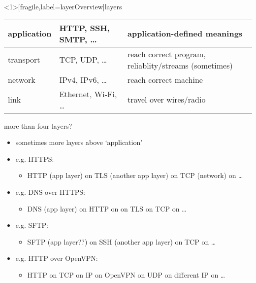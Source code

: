 \begin{frame}<1>[fragile,label=layerOverview]{layers}
\begin{tabular}{l|l|p{6cm}} \hline
application & HTTP, SSH, SMTP, \ldots & {application-defined meanings}\\ \hline
transport & TCP, UDP, \ldots & {reach correct program, reliablity/streams (sometimes)} \\
network & IPv4, IPv6, \ldots & {reach correct machine} \\
link & Ethernet, Wi-Fi, \ldots & travel over wires/radio \\
\end{tabular}
\end{frame}


\begin{frame}{more than four layers?}
    \begin{itemize}
    \item sometimes more layers above `application'
    \item e.g. HTTPS:
        \begin{itemize}
        \item HTTP (app layer) on TLS (another app layer) on TCP (network) on \ldots
        \end{itemize}
    \item e.g. DNS over HTTPS:
        \begin{itemize}
        \item DNS (app layer) on HTTP on on TLS on TCP on \ldots
        \end{itemize}
    \item e.g. SFTP:
        \begin{itemize}
        \item SFTP (app layer??) on SSH (another app layer) on TCP on \ldots
        \end{itemize}
    \item e.g. HTTP over OpenVPN:
        \begin{itemize}
        \item HTTP on TCP on IP on OpenVPN on UDP on different IP on \ldots
        \end{itemize}
    \end{itemize}
\end{frame}
